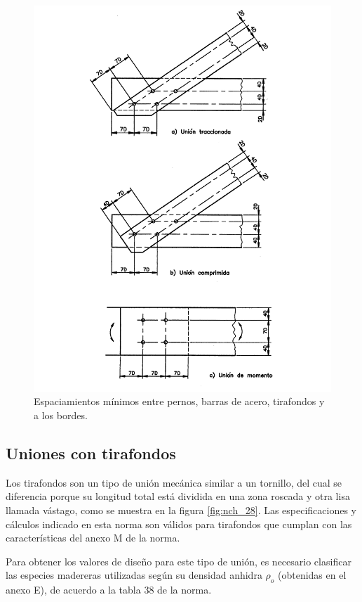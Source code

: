\begin{figure}[p]
\centering
\includegraphics[width=1\linewidth, angle=1,origin=c]{Imagenes/figura_26.pdf}%
\caption{Espaciamientos mínimos entre pernos, barras de acero, tirafondos y a los bordes. \cite{nch1198}}
\label{fig:nch_26}
\end{figure}

\newpage 

\subsection{Uniones con tirafondos}
\label{sec:tirafondos}
Los tirafondos son un tipo de unión mecánica similar a un tornillo, del cual se diferencia porque su longitud total está dividida en una zona roscada y otra lisa llamada vástago, como se muestra en la figura \ref{fig:nch_28}. Las especificaciones y cálculos indicado en esta norma son válidos para tirafondos que cumplan con las características del anexo M de la norma.

Para obtener los valores de diseño para este tipo de unión, es necesario clasificar las especies madereras utilizadas según su densidad anhidra $\rho_o$ (obtenidas en el anexo E), de acuerdo a la tabla 38 de la norma.

